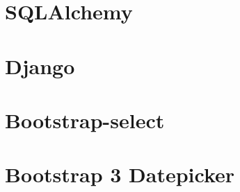 \section{SQLAlchemy}

\section{Django}


\section{Bootstrap-select}

\section{Bootstrap 3 Datepicker}